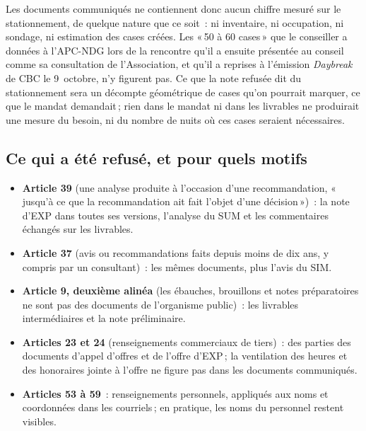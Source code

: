 \documentclass[11pt,letterpaper]{article}
\begin{document}
Les documents communiqués ne contiennent donc aucun chiffre mesuré sur le
stationnement, de quelque nature que ce soit~: ni inventaire, ni
occupation, ni sondage, ni estimation des cases créées. Les «\,50 à 60
cases\,» que le conseiller a données à l'APC-NDG lors de la rencontre
qu'il a ensuite présentée au conseil comme sa consultation de l'Association,
et qu'il a reprises à l'émission \emph{Daybreak} de CBC le 9~octobre, n'y
figurent pas. Ce que la note refusée dit du
stationnement sera un décompte géométrique de cases qu'on pourrait marquer,
ce que le mandat demandait\,; rien dans le mandat ni dans les livrables ne
produirait une mesure du besoin, ni du nombre de nuits où ces cases
seraient nécessaires.

\subsection{Ce qui a été refusé, et pour quels motifs}

\begin{itemize}[nosep]
  \item \textbf{Article 39} (une analyse produite à l'occasion d'une
    recommandation, «\,jusqu'à ce que la recommandation ait fait l'objet
    d'une décision\,»)~: la note d'EXP dans toutes ses versions, l'analyse du
    SUM et les commentaires échangés sur les livrables.
  \item \textbf{Article 37} (avis ou recommandations faits depuis moins de
    dix ans, y compris par un consultant)~: les mêmes documents, plus l'avis
    du SIM.
  \item \textbf{Article 9, deuxième alinéa} (les ébauches, brouillons et
    notes préparatoires ne sont pas des documents de l'organisme public)~:
    les livrables intermédiaires et la note préliminaire.
  \item \textbf{Articles 23 et 24} (renseignements commerciaux de tiers)~:
    des parties des documents d'appel d'offres et de l'offre d'EXP\,; la
    ventilation des heures et des honoraires jointe à l'offre ne figure pas
    dans les documents communiqués.
  \item \textbf{Articles 53 à 59}~: renseignements personnels, appliqués aux
    noms et coordonnées dans les courriels\,; en pratique, les noms du
    personnel restent visibles.
\end{itemize}
\end{document}
